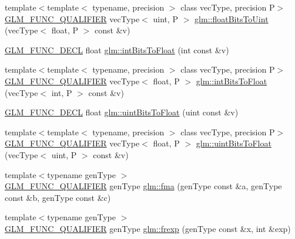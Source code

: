 \begin{DoxyCompactItemize}
\item 
{\footnotesize template$<$template$<$ typename, precision $>$ class vec\+Type, precision P$>$ }\\\hyperlink{setup_8hpp_a33fdea6f91c5f834105f7415e2a64407}{G\+L\+M\+\_\+\+F\+U\+N\+C\+\_\+\+Q\+U\+A\+L\+I\+F\+I\+ER} vec\+Type$<$ uint, P $>$ \hyperlink{group__core__func__common_ga1804d4c443605d8a27be644aa461afe4}{glm\+::float\+Bits\+To\+Uint} (vec\+Type$<$ float, P $>$ const \&v)
\item 
\hyperlink{setup_8hpp_ab2d052de21a70539923e9bcbf6e83a51}{G\+L\+M\+\_\+\+F\+U\+N\+C\+\_\+\+D\+E\+CL} float \hyperlink{group__core__func__common_ga2650dc57b2148a6ffbce20944fb4d97a}{glm\+::int\+Bits\+To\+Float} (int const \&v)
\item 
{\footnotesize template$<$template$<$ typename, precision $>$ class vec\+Type, precision P$>$ }\\\hyperlink{setup_8hpp_a33fdea6f91c5f834105f7415e2a64407}{G\+L\+M\+\_\+\+F\+U\+N\+C\+\_\+\+Q\+U\+A\+L\+I\+F\+I\+ER} vec\+Type$<$ float, P $>$ \hyperlink{group__core__func__common_gad21ab176dd0e6b59d923db5efca87f4e}{glm\+::int\+Bits\+To\+Float} (vec\+Type$<$ int, P $>$ const \&v)
\item 
\hyperlink{setup_8hpp_ab2d052de21a70539923e9bcbf6e83a51}{G\+L\+M\+\_\+\+F\+U\+N\+C\+\_\+\+D\+E\+CL} float \hyperlink{group__core__func__common_ga97464ca9ff4267de30ea408f700d4ca8}{glm\+::uint\+Bits\+To\+Float} (uint const \&v)
\item 
{\footnotesize template$<$template$<$ typename, precision $>$ class vec\+Type, precision P$>$ }\\\hyperlink{setup_8hpp_a33fdea6f91c5f834105f7415e2a64407}{G\+L\+M\+\_\+\+F\+U\+N\+C\+\_\+\+Q\+U\+A\+L\+I\+F\+I\+ER} vec\+Type$<$ float, P $>$ \hyperlink{group__core__func__common_ga3acab37650ecd792dc84548094b58684}{glm\+::uint\+Bits\+To\+Float} (vec\+Type$<$ uint, P $>$ const \&v)
\item 
{\footnotesize template$<$typename gen\+Type $>$ }\\\hyperlink{setup_8hpp_a33fdea6f91c5f834105f7415e2a64407}{G\+L\+M\+\_\+\+F\+U\+N\+C\+\_\+\+Q\+U\+A\+L\+I\+F\+I\+ER} gen\+Type \hyperlink{group__core__func__common_gad0f444d4b81cc53c3b6edf5aa25078c2}{glm\+::fma} (gen\+Type const \&a, gen\+Type const \&b, gen\+Type const \&c)
\item 
{\footnotesize template$<$typename gen\+Type $>$ }\\\hyperlink{setup_8hpp_a33fdea6f91c5f834105f7415e2a64407}{G\+L\+M\+\_\+\+F\+U\+N\+C\+\_\+\+Q\+U\+A\+L\+I\+F\+I\+ER} gen\+Type \hyperlink{namespaceglm_a3fab9fc606511c1751ff2173afccaa6e}{glm\+::frexp} (gen\+Type const \&x, int \&exp)

\end{DoxyCompactItemize}

